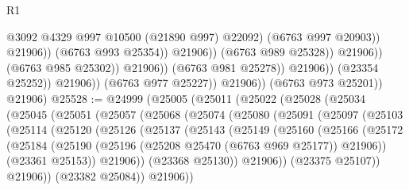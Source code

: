 \begin{lexlean}{R1}
\begin{coremodule}
                                                    @3092
                                                    @4329
                                                    @997
                                                    @10500
                                                    (@21890 @997)
                                                    @22092)
                                                  (@6763 @997 @20903))
                                                @21906))
                                            (@6763 @993 @25354))
                                          @21906))
                                      (@6763 @989 @25328))
                                    @21906))
                                (@6763 @985 @25302))
                              @21906))
                          (@6763 @981 @25278))
                        @21906))
                    (@23354 @25252))
                  @21906))
              (@6763 @977 @25227))
            @21906))
        (@6763 @973 @25201))
      @21906)
@25528 := @24999
    (@25005
      (@25011
        (@25022
          (@25028
            (@25034
              (@25045
                (@25051
                  (@25057
                    (@25068
                      (@25074
                        (@25080
                          (@25091
                            (@25097
                              (@25103
                                (@25114
                                  (@25120
                                    (@25126
                                      (@25137
                                        (@25143
                                          (@25149
                                            (@25160
                                              (@25166
                                                (@25172
                                                  (@25184
                                                    (@25190
                                                      (@25196
                                                        (@25208 @25470 (@6763 @969 @25177))
                                                        @21906))
                                                    (@23361 @25153))
                                                  @21906))
                                              (@23368 @25130))
                                            @21906))
                                        (@23375 @25107))
                                      @21906))
                                  (@23382 @25084))
                                @21906))

\end{coremodule}
\end{lexlean}
